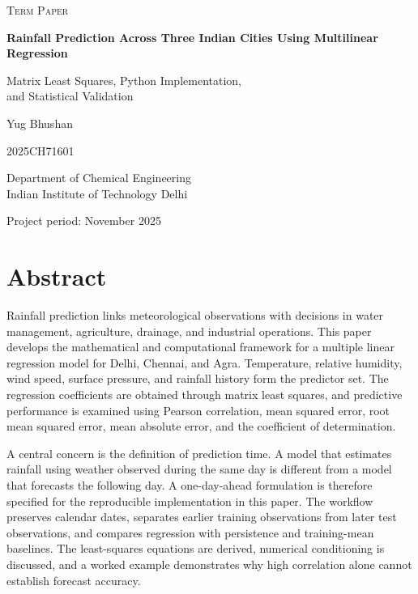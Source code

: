 \documentclass[11pt,a4paper]{article}
\begin{document}
\begin{titlepage}
\centering
\vspace*{22mm}
{\Large\scshape Term Paper\par}
\vspace{16mm}
{\huge\bfseries Rainfall Prediction Across Three Indian Cities Using Multilinear Regression\par}
\vspace{9mm}
{\large Matrix Least Squares, Python Implementation,\\and Statistical Validation\par}
\vspace{24mm}
{\Large Yug Bhushan\par}
\vspace{3mm}
{\large 2025CH71601\par}
\vspace{7mm}
Department of Chemical Engineering\\
Indian Institute of Technology Delhi
\vfill
{\large Project period: November 2025\par}
\vspace{12mm}
\end{titlepage}

\section*{Abstract}
Rainfall prediction links meteorological observations with decisions in water management, agriculture, drainage, and industrial operations. This paper develops the mathematical and computational framework for a multiple linear regression model for Delhi, Chennai, and Agra. Temperature, relative humidity, wind speed, surface pressure, and rainfall history form the predictor set. The regression coefficients are obtained through matrix least squares, and predictive performance is examined using Pearson correlation, mean squared error, root mean squared error, mean absolute error, and the coefficient of determination.

A central concern is the definition of prediction time. A model that estimates rainfall using weather observed during the same day is different from a model that forecasts the following day. A one-day-ahead formulation is therefore specified for the reproducible implementation in this paper. The workflow preserves calendar dates, separates earlier training observations from later test observations, and compares regression with persistence and training-mean baselines. The least-squares equations are derived, numerical conditioning is discussed, and a worked example demonstrates why high correlation alone cannot establish forecast accuracy.
\end{document}

